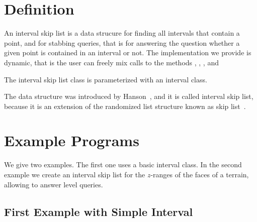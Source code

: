 
\ccParDims

\label{chapter_Interval_skip_list}




\section{Definition}
  
An interval skip list is a data strucure for finding all intervals 
that contain a point, and for stabbing queries, that is for answering 
the question whether a given point is contained in an interval or not. 
The implementation we provide is dynamic, that is the user can freely
mix calls  to the methods , , 
, and 

The interval skip list class is parameterized with an interval class.

The data structure was introduced by Hanson~\cite{h-islds-91}, and it is called
interval skip list, because it is an extension of the randomized list
structure known as skip list~\cite{p-slpab-90}.
 
\section{Example Programs}
\label{sectionIntervalskiplistExamples}

We give two examples. The first one uses a basic interval class.  In
the second example we create an interval skip list for the $z$-ranges
of the faces of a terrain, allowing to answer level queries.

\subsection{First Example with Simple Interval}

